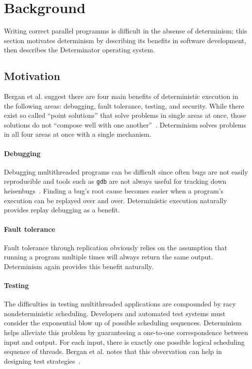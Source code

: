 
\section{Background}

Writing correct parallel programms is difficult in the absense of determinism;
this section motivates determinism by describing its benefits in software
development, then describes the Determinator operating system.
\iffalse
Determinator's programming model is ``\emph{naturally} and
\emph{pervasively} deterministic''~\cite{Aviram10}. This background section describes and
motivates Determinator, then gives motivation for adding determinism to Linux.
\fi

\subsection{Motivation}

Bergan et al. suggest there are four main benefits of deterministic execution in
the following areas: debugging, fault tolerance, testing, and security. While
there exist so called ``point solutions'' that solve problems in single areas at
once, those solutions do not ``compose well with one another''~\cite{Bergan11}.
Determinism solves problems in all four areas at once with a single mechanism.

\paragraph{Debugging} Debugging multithreaded programs can be difficult since
often bugs are not easily reproducible and tools such as {\tt gdb} are not
always useful for tracking down heisenbugs~\cite{Musuvathi08}. Finding a bug's
root cause becomes easier when a program's execution can be replayed over and
over. Deterministic execution naturally provides replay debugging as a benefit.

\paragraph{Fault tolerance} Fault tolerance through replication obviously relies
on the assumption that running a program multiple times will always return the
same output. Determinism again provides this benefit naturally.

\paragraph{Testing} The difficulties in testing multithreaded applications are
compounded by racy nondeterministic scheduling. Developers and automated test
systems must consider the exponential blow up of possible scheduling sequences.
Determinism helps alleviate this problem by guaranteeing a one-to-one
correspondence between input and output. For each input, there is exactly one
possible logical scheduling sequence of threads. Bergan et al. notes that this
obvervation can help in designing test strategies~\cite{Bergan11}.

